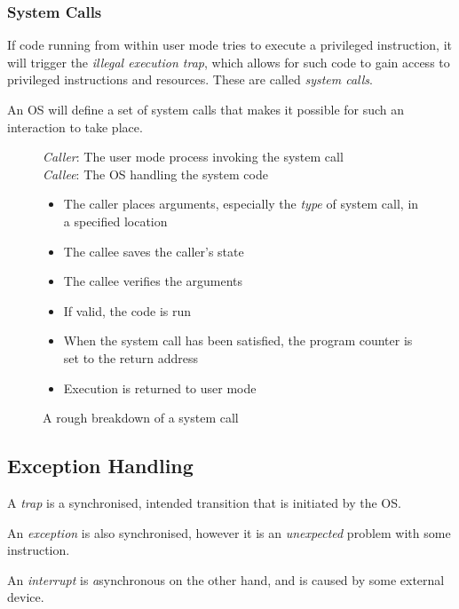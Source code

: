 \documentclass{article}
\begin{document}
\subsubsection{System Calls}

If code running from within user mode tries to execute a privileged instruction, it will trigger the \textit{illegal execution trap}, which allows for such code to gain access to privileged instructions and resources. These are called \textit{system calls}.

An OS will define a set of system calls that makes it possible for such an interaction to take place.

\begin{figure}[H]
  \begin{framed}
    \textit{Caller}: The user mode process invoking the system call\\
    \textit{Callee}: The OS handling the system code\\
    \begin{itemize}
    \item The caller places arguments, especially the \textit{type} of system call, in a specified location
    \item The callee saves the caller's state
    \item The callee verifies the arguments
    \item If valid, the code is run
    \item When the system call has been satisfied, the program counter is set to the return address
    \item Execution is returned to user mode
    \end{itemize}
  \end{framed}
  \caption{A rough breakdown of a system call}
\end{figure}

\subsection{Exception Handling}

A \textit{trap} is a synchronised, intended transition that is initiated by the OS.

An \textit{exception} is also synchronised, however it is an \textit{unexpected} problem with some instruction.

An \textit{interrupt} is \textit{a}synchronous on the other hand, and is caused by some external device.
\end{document}

